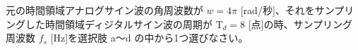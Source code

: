 元の時間領域アナログサイン波の角周波数が $w = 4\pi$ [rad/秒]、それをサンプリングした時間領域ディジタルサイン波の周期が $\textrm{T}_d = 8$ [点]の時、サンプリング周波数 $f_s$ [Hz]を選択肢 a〜d の中から1つ選びなさい。

